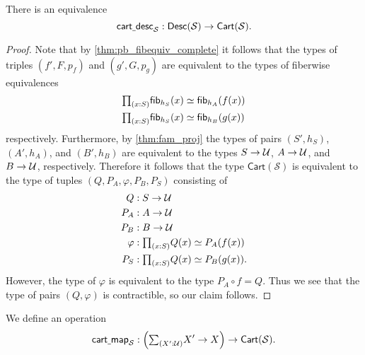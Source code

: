 \begin{lem}\label{lem:cart_desc}
There is an equivalence
\begin{equation*}
\mathsf{cart\underline{\ }{}desc}_{\mathcal{S}}:\mathsf{Desc}(\mathcal{S})\to \mathsf{Cart}(\mathcal{S}).
\end{equation*}
\end{lem}

\begin{proof}
Note that by \cref{thm:pb_fibequiv_complete} it follows that the types of triples $(f',F,p_f)$ and $(g',G,p_g)$ are equivalent to the types of fiberwise equivalences
\begin{align*}
& \prd{x:S}\eqv{\fib{h_S}{x}}{\fib{h_A}{f(x)}} \\
& \prd{x:S}\eqv{\fib{h_S}{x}}{\fib{h_B}{g(x)}}
\end{align*} 
respectively. Furthermore, by \cref{thm:fam_proj} the types of pairs $(S',h_S)$, $(A',h_A)$, and $(B',h_B)$ are equivalent to the types $S\to \mathcal{U}$, $A\to \mathcal{U}$, and $B\to \mathcal{U}$, respectively. Therefore it follows that the type $\mathsf{Cart}(\mathcal{S})$ is equivalent to the type of tuples $(Q,P_A,\varphi,P_B,P_S)$ consisting of
\begin{align*}
Q & : S\to \UU \\
P_A & : A \to \UU \\
P_B & : B \to \UU \\
\varphi & : \prd{x:S}\eqv{Q(x)}{P_A(f(x))} \\
P_S & : \prd{x:S}\eqv{Q(x)}{P_B(g(x))}.
\end{align*}
However, the type of $\varphi$ is equivalent to the type $P_A\circ f=Q$. Thus we see that the type of pairs $(Q,\varphi)$ is contractible, so our claim follows.
\end{proof}

\begin{defn}
We define an operation
\begin{equation*}
\mathsf{cart\usc{}map}_{\mathcal{S}}:{\Big(\sm{X':\UU}X'\to X\Big)}\to \mathsf{Cart}(\mathcal{S}).
\end{equation*}
\end{defn}

